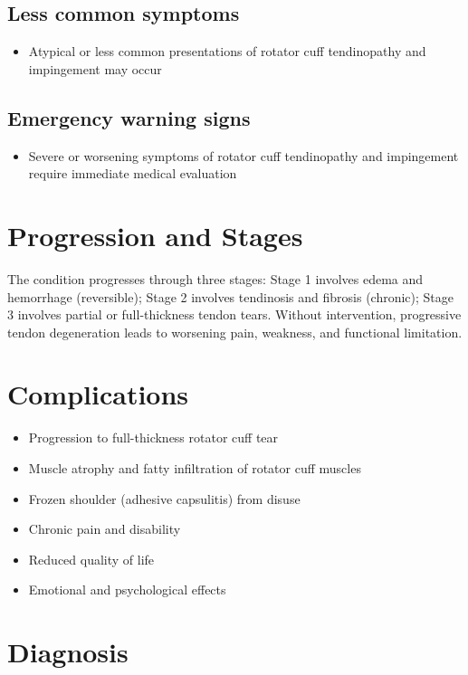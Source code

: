 \subsection{Less common symptoms}
\begin{itemize}[noitemsep]
  \item Atypical or less common presentations of rotator cuff tendinopathy and impingement may occur
\end{itemize}

\subsection{Emergency warning signs}
\begin{itemize}[noitemsep]
  \item Severe or worsening symptoms of rotator cuff tendinopathy and impingement require immediate medical evaluation
\end{itemize}
\section{Progression and Stages}
The condition progresses through three stages: Stage 1 involves edema and hemorrhage (reversible); Stage 2 involves tendinosis and fibrosis (chronic); Stage 3 involves partial or full-thickness tendon tears. Without intervention, progressive tendon degeneration leads to worsening pain, weakness, and functional limitation.

\section{Complications}

\begin{itemize}[noitemsep]
  \item Progression to full-thickness rotator cuff tear
  \item Muscle atrophy and fatty infiltration of rotator cuff muscles
  \item Frozen shoulder (adhesive capsulitis) from disuse
  \item Chronic pain and disability
  \item Reduced quality of life
  \item Emotional and psychological effects
\end{itemize}

\section{Diagnosis}

